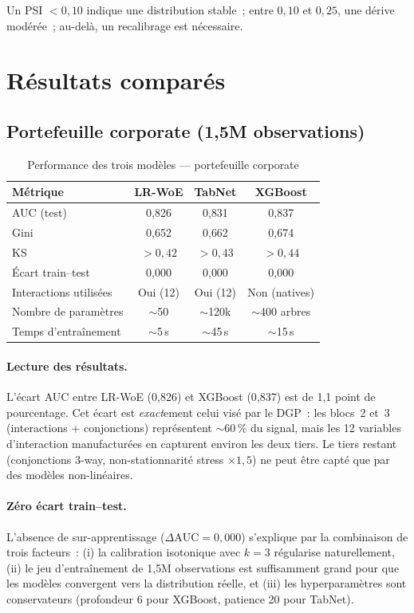 \documentclass[12pt, a4paper, twoside, openright]{report}
\theoremstyle{definition}
\begin{document}
Un PSI $< 0{,}10$ indique une distribution stable~; entre $0{,}10$ et $0{,}25$, une dérive modérée~; au-delà, un recalibrage est nécessaire.

\section{Résultats comparés}
\label{sec:pd:resultats}

\subsection{Portefeuille corporate (1{,}5M observations)}

\begin{table}[htbp]
\centering
\caption{Performance des trois modèles --- portefeuille corporate}
\label{tab:resultats-corporate}
\begin{tabular}{lccc}
\toprule
Métrique & LR-WoE & TabNet & XGBoost \\
\midrule
AUC (test) & 0{,}826 & 0{,}831 & 0{,}837 \\
Gini & 0{,}652 & 0{,}662 & 0{,}674 \\
KS & $> 0{,}42$ & $> 0{,}43$ & $> 0{,}44$ \\
Écart train--test & 0{,}000 & 0{,}000 & 0{,}000 \\
\midrule
Interactions utilisées & Oui (12) & Oui (12) & Non (natives) \\
Nombre de paramètres & $\sim$50 & $\sim$120k & $\sim$400 arbres \\
Temps d'entraînement & $\sim$5\,s & $\sim$45\,s & $\sim$15\,s \\
\bottomrule
\end{tabular}
\end{table}

\paragraph{Lecture des résultats.} L'écart AUC entre LR-WoE (0{,}826) et XGBoost (0{,}837) est de 1{,}1 point de pourcentage. Cet écart est \emph{exact}ement celui visé par le DGP~: les blocs~2 et~3 (interactions + conjonctions) représentent $\sim$60\,\% du signal, mais les 12 variables d'interaction manufacturées en capturent environ les deux tiers. Le tiers restant (conjonctions 3-way, non-stationnarité stress $\times 1{,}5$) ne peut être capté que par des modèles non-linéaires.

\paragraph{Zéro écart train--test.} L'absence de sur-apprentissage ($\Delta\text{AUC} = 0{,}000$) s'explique par la combinaison de trois facteurs~: (i) la calibration isotonique avec $k=3$ régularise naturellement, (ii) le jeu d'entraînement de 1{,}5M observations est suffisamment grand pour que les modèles convergent vers la distribution réelle, et (iii) les hyperparamètres sont conservateurs (profondeur 6 pour XGBoost, patience 20 pour TabNet).
\end{document}
